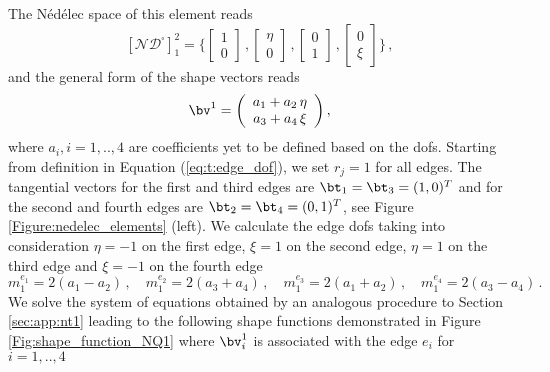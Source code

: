 The  N\'ed\'elec space of this element reads 
 \begin{equation}
  \left[ \mathcal{ND}^\square \right]^{2}_1 = \bigg\{ \left[ \begin{array}{c}
1 \\
0  
  \end{array} \right] \,, \left[ \begin{array}{c}
\eta \\
0
  \end{array} \right]  \,, \left[ \begin{array}{c}
0 \\
1
  \end{array} \right]  \,, \left[ \begin{array}{c}
0 \\
\xi
  \end{array} \right]\bigg\} \,,
 \end{equation}
and the general form of the shape vectors reads 
\begin{equation}
\bv^1 =  \left( \begin{array}{c}
a_1 + a_2 \, \eta  \\ a_3 + a_4 \, \xi
\end{array} \right),
\end{equation}
where $a_i, i=1,..,4$ are coefficients yet to be defined based on the dofs. Starting from definition in Equation (\ref{eq:t:edge_dof}), we set $r_j = 1$ for all edges. The tangential vectors for the first and third edges are $\bt_1 = \bt_3 = (1,0)^T$ and for the second and fourth edges are $\bt_2 = \bt_4 = (0,1)^T$, see Figure \ref{Figure:nedelec_elements} (left).  We calculate the edge dofs taking into consideration $\eta = -1$ on the first edge, $\xi = 1$ on the second edge, $\eta = 1$ on the third edge and $\xi = -1$ on the fourth edge
\begin{equation}
m^{e_1}_{1} = 2(a_1 - a_2)\,, \quad
m^{e_2}_{1} = 2(a_3 + a_4)\,, \quad
m^{e_3}_{1} = 2(a_1 + a_2)\,, \quad
m^{e_4}_{1} = 2(a_3 - a_4) \,.
\end{equation}
We solve the system of equations obtained by an  analogous procedure to Section \ref{sec:app:nt1} leading to the following shape functions demonstrated in Figure \ref{Fig:shape_function_NQ1} where $\bv^1_i$ is associated with the edge $e_i$ for $i=1,..,4$

